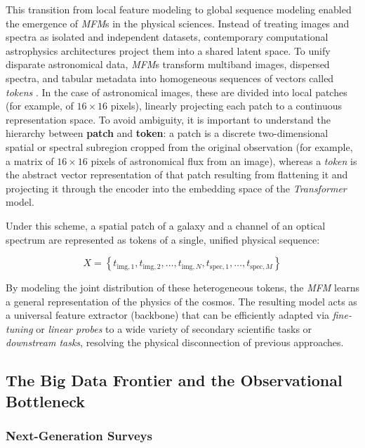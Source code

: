 This transition from local feature modeling to global sequence modeling enabled the emergence of \textit{\gls{MFM}}s \autocite{ar:bommasani-2021} in the physical sciences. Instead of treating images and spectra as isolated and independent datasets, contemporary computational astrophysics architectures project them into a shared latent space. To unify disparate astronomical data, \textit{\gls{MFM}}s transform multiband images, dispersed spectra, and tabular metadata into homogeneous sequences of vectors called \textit{tokens} \autocites{ar:astropt}{ar:astroclip}{ar:aion-1}. In the case of astronomical images, these are divided into local patches (for example, of $16 \times 16$ pixels), linearly projecting each patch to a continuous representation space. To avoid ambiguity, it is important to understand the hierarchy between \textbf{patch} and \textbf{token}: a patch is a discrete two-dimensional spatial or spectral subregion cropped from the original observation (for example, a matrix of $16 \times 16$ pixels of astronomical flux from an image), whereas a \textit{token} is the abstract vector representation of that patch resulting from flattening it and projecting it through the encoder into the embedding space of the \textit{Transformer} model.

Under this scheme, a spatial patch of a galaxy and a channel of an optical spectrum are represented as tokens of a single, unified physical sequence:

\begin{equation}
  X = \left\{t_{\text{img}, 1}, t_{\text{img}, 2}, \dots, t_{\text{img}, N}, t_{\text{spec}, 1}, \dots, t_{\text{spec}, M}\right\}
  \label{eq:token_sequence}
\end{equation}

By modeling the joint distribution of these heterogeneous tokens, the \textit{\gls{MFM}} learns a general representation of the physics of the cosmos. The resulting model acts as a universal feature extractor (backbone) that can be efficiently adapted via \textit{fine-tuning} or \textit{linear probes} to a wide variety of secondary scientific tasks or \textit{downstream tasks}, resolving the physical disconnection of previous approaches.


\subsection{The Big Data Frontier and the Observational Bottleneck}

\subsubsection{Next-Generation Surveys}

